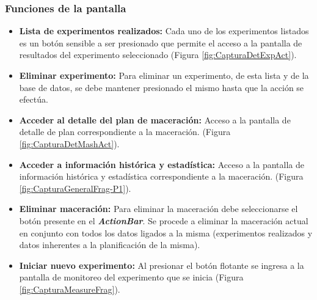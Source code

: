             \subsubsection{Funciones de la pantalla}
                \begin{itemize}
                    \item \textbf{Lista de experimentos realizados:} Cada uno de los experimentos listados es un botón sensible a ser presionado que permite el acceso a la pantalla de resultados del experimento seleccionado (Figura \ref{fig:CapturaDetExpAct}).
             
                    \item \textbf{Eliminar experimento:} Para eliminar un experimento, de esta lista y de la base de datos, se debe mantener presionado el mismo hasta que la acción se efectúa. 
           
                    \item \textbf{Acceder al detalle del plan de maceración:} Acceso a la pantalla de detalle de plan correspondiente a la maceración. (Figura \ref{fig:CapturaDetMashAct}).
                    
                    \item \textbf{Acceder a información histórica y estadística:} Acceso a la pantalla de información histórica y estadística correspondiente a la maceración. (Figura \ref{fig:CapturaGeneralFrag-P1}).
                    
                    \item \textbf{Eliminar maceración:} Para eliminar la maceración debe seleccionarse el botón presente en el \textbf{\textit{\gls{ActionBar}}}. Se procede a eliminar la maceración actual en conjunto con todos los datos ligados a la misma (experimentos realizados y datos inherentes a la planificación de la misma).
                    
                    \item \textbf{Iniciar nuevo experimento:} Al presionar el botón flotante se ingresa a la pantalla de monitoreo del experimento que se inicia (Figura \ref{fig:CapturaMeasureFrag}).
                    
                \end{itemize}
                
